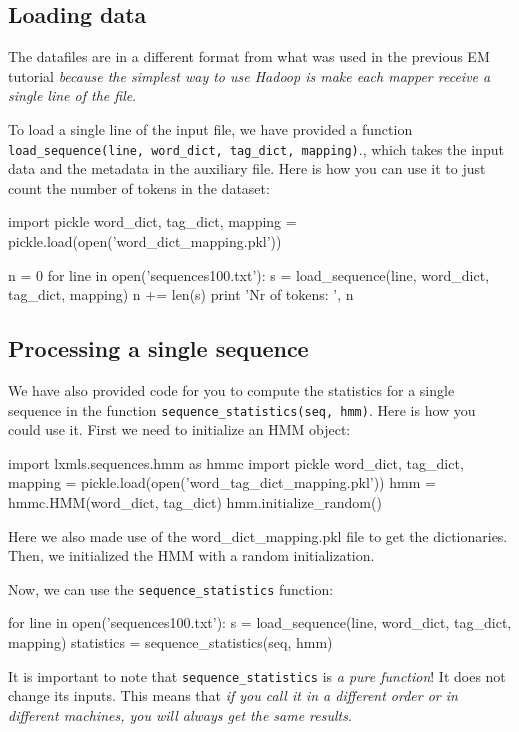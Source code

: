 \subsection{Loading data}

The datafiles are in a different format from what was used in the previous EM
tutorial \emph{because the simplest way to use Hadoop is make each mapper
receive a single line of the file}.

To load a single line of the input file, we have provided a function
\verb+load_sequence(line, word_dict, tag_dict, mapping)+., which takes the
input data and the metadata in the auxiliary file. Here is how you can use it
to just count the number of tokens in the dataset:

\begin{python}
import pickle
word_dict, tag_dict, mapping = pickle.load(open('word_dict_mapping.pkl'))

n = 0
for line in open('sequences100.txt'):
    s = load_sequence(line, word_dict, tag_dict, mapping)
    n += len(s)
print 'Nr of tokens: ', n
\end{python}

\subsection{Processing a single sequence}

We have also provided code for you to compute the statistics for a single
sequence in the function \verb+sequence_statistics(seq, hmm)+. Here is how you
could use it. First we need to initialize an HMM object:

\begin{python}
import lxmls.sequences.hmm as hmmc
import pickle
word_dict, tag_dict, mapping = pickle.load(open('word_tag_dict_mapping.pkl'))
hmm = hmmc.HMM(word_dict, tag_dict)
hmm.initialize_random()
\end{python}

Here we also made use of the word\_dict\_mapping.pkl file to get the
dictionaries. Then, we initialized the HMM with a random initialization.

Now, we can use the \verb+sequence_statistics+ function:

\begin{python}
for line in open('sequences100.txt'):
    s = load_sequence(line, word_dict, tag_dict, mapping)
    statistics = sequence_statistics(seq, hmm)
\end{python}

It is important to note that \verb+sequence_statistics+ is \emph{a pure
function}! It does not change its inputs. This means that \emph{if you call it
in a different order or in different machines, you will always get the same
results}.

